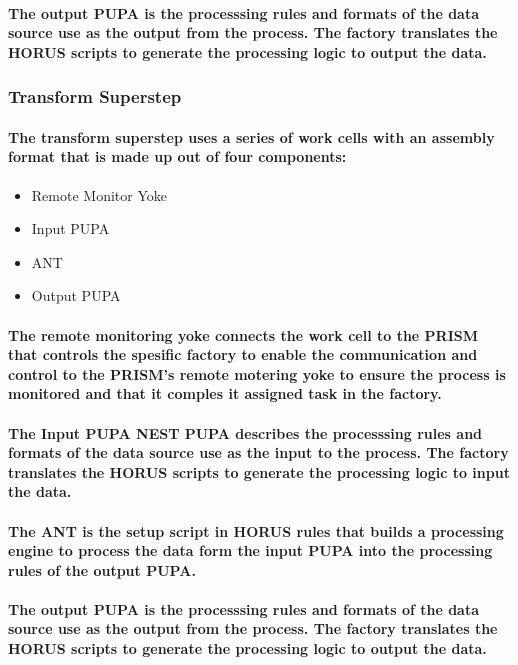 \documentclass{acm_proc_article-sp}
\begin{document}
\paragraph{The output PUPA is the processsing rules and formats of the data source use as the output from the process. The factory translates the HORUS scripts to generate the processing logic to output the data.}
\subsubsection{Transform Superstep}
\paragraph{The transform superstep uses a series of work cells with an assembly format that is made up out of four components:}
\begin{itemize}
\item{Remote Monitor Yoke}
\item{Input PUPA}
\item{ANT}
\item{Output PUPA}
\end{itemize}
\paragraph{The remote monitoring yoke connects the work cell to the PRISM that controls the spesific factory to enable the communication and control to the PRISM's remote motering yoke to ensure the process is monitored and that it comples it assigned task in the factory.}
\paragraph{The Input PUPA NEST PUPA describes the processsing rules and formats of the data source use as the input to the process. The factory translates the HORUS scripts to generate the processing logic to input the data.}
\paragraph{The ANT is the setup script in HORUS rules that builds a processing engine to process the data form the input PUPA into the processing rules of the output PUPA. }
\paragraph{The output PUPA is the processsing rules and formats of the data source use as the output from the process. The factory translates the HORUS scripts to generate the processing logic to output the data.}
\end{document}

